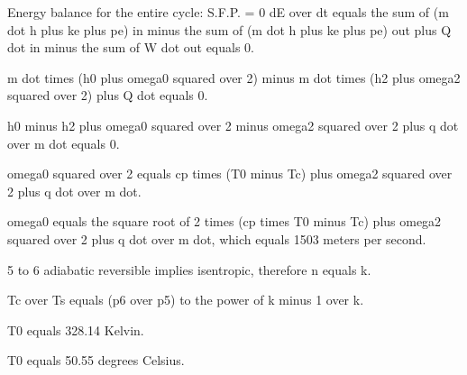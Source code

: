 Energy balance for the entire cycle:
S.F.P. = 0
dE over dt equals the sum of (m dot h plus ke plus pe) in minus the sum of (m dot h plus ke plus pe) out plus Q dot in minus the sum of W dot out equals 0.

m dot times (h0 plus omega0 squared over 2) minus m dot times (h2 plus omega2 squared over 2) plus Q dot equals 0.

h0 minus h2 plus omega0 squared over 2 minus omega2 squared over 2 plus q dot over m dot equals 0.

omega0 squared over 2 equals cp times (T0 minus Tc) plus omega2 squared over 2 plus q dot over m dot.

omega0 equals the square root of 2 times (cp times T0 minus Tc) plus omega2 squared over 2 plus q dot over m dot, which equals 1503 meters per second.

5 to 6 adiabatic reversible implies isentropic, therefore n equals k.

Tc over Ts equals (p6 over p5) to the power of k minus 1 over k.

T0 equals 328.14 Kelvin.

T0 equals 50.55 degrees Celsius.